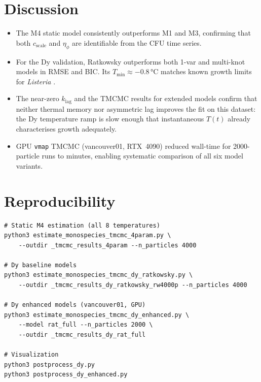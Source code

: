 \documentclass[11pt,a4paper]{article}
\begin{document}
\section{Discussion}
\begin{itemize}
  \item The M4 static model consistently outperforms M1 and M3, confirming that
        both $c_{\mathrm{scale}}$ and $\eta_\phi$ are identifiable from the CFU
        time series.
  \item For the Dy validation, Ratkowsky outperforms both 1-var and multi-knot
        models in RMSE and BIC. Its $T_{\min}\approx -0.8$\,°C matches known
        growth limits for \textit{Listeria} \cite{liu2019}.
  \item The near-zero $k_{\mathrm{lag}}$ and the TMCMC results for extended models
        confirm that neither thermal memory nor asymmetric lag improves the fit
        on this dataset: the Dy temperature ramp is slow enough that
        instantaneous $T(t)$ already characterises growth adequately.
  \item GPU \texttt{vmap} TMCMC (vancouver01, RTX~4090) reduced wall-time for
        2000-particle runs to minutes, enabling systematic comparison of all
        six model variants.
\end{itemize}

\section{Reproducibility}
\begin{verbatim}
# Static M4 estimation (all 8 temperatures)
python3 estimate_monospecies_tmcmc_4param.py \
    --outdir _tmcmc_results_4param --n_particles 4000

# Dy baseline models
python3 estimate_monospecies_tmcmc_dy_ratkowsky.py \
    --outdir _tmcmc_results_dy_ratkowsky_rw4000p --n_particles 4000

# Dy enhanced models (vancouver01, GPU)
python3 estimate_monospecies_tmcmc_dy_enhanced.py \
    --model rat_full --n_particles 2000 \
    --outdir _tmcmc_results_dy_rat_full

# Visualization
python3 postprocess_dy.py
python3 postprocess_dy_enhanced.py
\end{verbatim}
\end{document}
